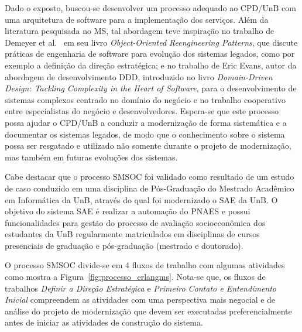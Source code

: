 Dado o exposto, 
buscou-se desenvolver
um processo adequado ao CPD/UnB
com uma arquitetura de software para a implementação dos serviços.
Além da literatura pesquisada no \acrshort{MS},
tal abordagem teve inspiração no trabalho
de Demeyer et al.~\cite{OORP2013} em seu livro 
\textit{Object-Oriented Reengineering Patterns},
que discute práticas 
de engenharia de software
para evolução dos sistemas legados,
como por exemplo a definição da direção estratégica; 
e no trabalho de Eric Evans, autor 
da abordagem de desenvolvimento
\acrfull{DDD},
introduzido no livro \textit{Domain-Driven Design: Tackling Complexity in the Heart of Software},
para o desenvolvimento de sistemas complexos
centrado no domínio do negócio
e no trabalho cooperativo 
entre especialistas do negócio e desenvolvedores.
Espera-se que este processo possa ajudar 
o CPD/UnB a conduzir a modernização de forma 
sistemática e a 
documentar os sistemas legados,
de modo que o conhecimento sobre o sistema possa ser resgatado
e utilizado não somente durante o projeto de modernização,
mas também em futuras evoluções dos sistemas.

Cabe destacar que o processo \acrshort{SMSOC} 
foi validado como  
resultado de um estudo de caso
conduzido em uma disciplina de Pós-Graduação
do Mestrado Acadêmico em Informática da \acrshort{UnB},
através do qual foi modernizado o \acrfull{SAE} 
da \acrlong{UnB}. O objetivo do sistema \acrshort{SAE} é realizar
a automação
do \acrfull{PNAES} e possui funcionalidades 
para gestão do processo de 
avaliação socioeconômica dos estudantes da \acrshort{UnB} 
regularmente matriculados em disciplinas de cursos
presenciais de graduação e pós-graduação (mestrado e doutorado).

O processo \acrshort{SMSOC} divide-se
em 4 fluxos de trabalho com
algumas atividades como mostra a Figura~\ref{fig:processo_erlangms}.
Nota-se que, os fluxos de trabalhos \emph{Definir a Direção Estratégica}
e \emph{Primeiro Contato e Entendimento Inicial}
compreendem as atividades com uma perspectiva mais negocial
e de análise do projeto de modernização
que devem ser executadas preferencialmente 
antes de iniciar as atividades de construção do sistema.


